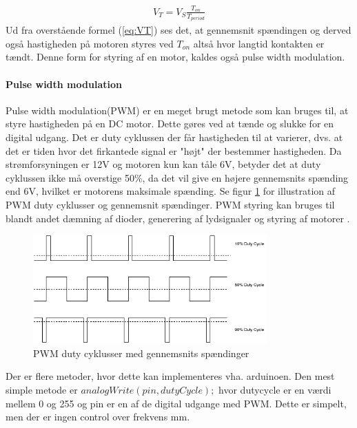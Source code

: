 \begin{align}
V_T=V_S \frac{T_{on}}{T_{period}}
\label{eq:VT}
\end{align}
Ud fra overstående formel (\ref{eq:VT}) ses det, at gennemsnit spændingen og derved også hastigheden på motoren styres ved $T_{on}$ altså hvor langtid kontakten er tændt. Denne form for styring af en motor, kaldes også pulse width modulation.



\paragraph{Pulse width modulation} \phantom{mmmmmmmmmmmmmmmmmkkkkkkkkkkkkkkkkkkkkkkkkkkkkkkkkmmmmmmmmmmmmmmmmmmmmmm}

Pulse width modulation(PWM) er en meget brugt metode som kan bruges til, at styre hastigheden på en DC motor. Dette gøres ved at tænde og slukke for en digital udgang. Det er duty cyklussen der får hastigheden til at varierer, dvs. at det er tiden hvor det firkantede signal er "højt" der bestemmer hastigheden. Da strømforsyningen er 12V og motoren kun kan tåle 6V, betyder det at duty cyklussen ikke må overstige 50\%, da det vil give en højere gennemsnits spænding end 6V, hvilket er motorens maksimale spænding. Se figur \ref{fig:pwmsignal} for illustration af PWM duty cyklusser og gennemsnit spændinger. PWM styring kan bruges til blandt andet dæmning af dioder, generering af lydsignaler og styring af motorer . 

 \begin{figure}[H]
	\centering
	\includegraphics[width=0.8\textwidth]{billeder/Hardware/pwm.png}
	\caption{PWM duty cyklusser med gennemsnits spændinger}
	\label{fig:pwmsignal}
\end{figure}

Der er flere metoder, hvor dette kan implementeres vha. arduinoen. Den mest simple metode er $analogWrite(pin, dutyCycle);$ hvor dutycycle er en værdi mellem 0 og 255 og pin er en af de digital udgange med PWM. Dette er simpelt, men der er ingen control over frekvens mm. 

